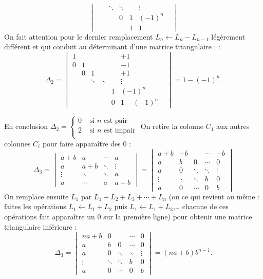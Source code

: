 {{$$\begin{vmatrix}
    & & \ddots      &\ddots  & &\vdots& \\
   & &&0 &1 & (-1)^{n} \\
  &  &       &&1      &1                 
               \end{vmatrix}
$$
On fait attention pour le dernier remplacement $L_n \leftarrow L_n-L_{n-1}$ légèrement différent et qui conduit au déterminant d'une matrice triangulaire : :
$$\Delta_2 = \begin{vmatrix}
  1 &      &    &   &&+1 \\
  0 &1      && &  &-1\\
    & 0      &1  & & &+1\\
    & & \ddots      &\ddots  & &\vdots& \\
   & && &1 & (-1)^{n}\\
  &  &       &&0      &1 - (-1)^{n}                 
               \end{vmatrix}
= 1 - (-1)^{n}.
$$

En conclusion $\Delta_2 = \begin{cases}
                           0 & \text{ si $n$ est pair} \\
                           2 & \text{ si $n$ est impair} \\                           
                          \end{cases}$
On retire la colonne $C_1$ aux autres colonnes $C_i$ pour faire apparaître des $0$ :
$$\Delta_3 = \begin{vmatrix}
    a+b  &    a   & \cdots &  a       \\
     a   &   a+b  & \ddots & \vdots   \\
  \vdots & \ddots & \ddots &  a       \\
     a   & \cdots &    a   & a+b 
\end{vmatrix}
= \begin{vmatrix}
    a+b  &    -b   & & \cdots &  -b       \\
     a   &   b     &   0 & \cdots        &  0   \\
     a   &   0 &  \ddots & \ddots & \vdots   \\
  \vdots & \ddots & \ddots &  b & 0       \\
     a   &  0 & \cdots &    0   & b 
\end{vmatrix}$$
On remplace ensuite $L_1$ par $L_1+L_2+L_3+\cdots +L_n$
(ou ce qui revient au même : faites les opérations 
$L_1 \leftarrow L_1+L_2$ puis $L_1 \leftarrow L_1+L_3$,\ldots
chacune de ces opérations fait apparaître un $0$ sur la première ligne)
pour obtenir une matrice triangulaire inférieure :
$$\Delta_3 = \begin{vmatrix}
   na+b  &    0   & & \cdots &  0       \\
     a   &   b     &   0 & \cdots        &  0   \\
     a   &   0 &  \ddots & \ddots & \vdots   \\
  \vdots & \ddots & \ddots &  b & 0       \\
     a   &  0 & \cdots &    0   & b 
\end{vmatrix}=(na+b)b^{n-1}.$$
}
}
